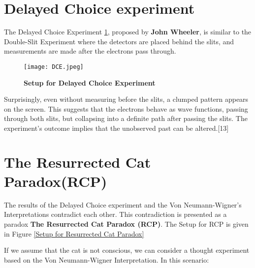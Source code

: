 \documentclass{article}
\begin{document}
\section{\Large \textbf{Delayed Choice experiment}}

The Delayed Choice Experiment \ref{Setup for Delayed Choice Experiment}, proposed by \textbf{John Wheeler}, is similar to the Double-Slit Experiment where the detectors are placed behind the slits, and measurements are made after the electrons pass through. 



\begin{figure}[h]
    \centering 
    \texttt{[image: DCE.jpeg]}
    \caption{\textbf{Setup for Delayed Choice Experiment}}
    \label{Setup for Delayed Choice Experiment}
\end{figure}

Surprisingly, even without measuring before the slits, a clumped pattern appears on the screen. This suggests that the electrons behave as wave functions, passing through both slits, but collapsing into a definite path after passing the slits. The experiment's outcome implies that the unobserved past can be altered.[13]



\section{\Large \textbf{The Resurrected Cat Paradox(RCP)}}

The results of the Delayed Choice experiment and the Von
Neumann-Wigner's Interpretations contradict each other. This
contradiction is presented as a paradox \textbf{The Resurrected Cat Paradox (RCP)}. The Setup for RCP is given in Figure \ref{Setup for Resurrected Cat Paradox}

If we assume that the cat is not conscious, we can consider a thought experiment based on the Von Neumann-Wigner Interpretation. In this scenario:
\end{document}
